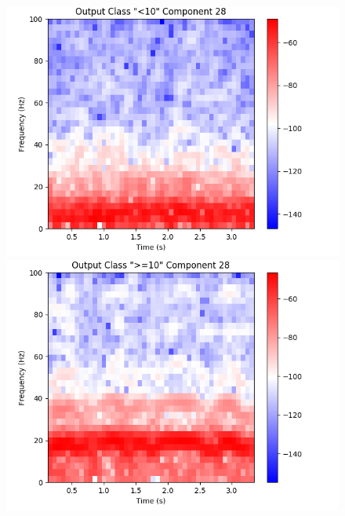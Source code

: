 \documentclass[fleqn,10pt]{wlscirep}
\begin{document}
\begin{figure}
\begin{minipage}{0.24\textwidth}
    \includegraphics[width=\linewidth]{max_act/artificial_spec_28_0.png}
    \subcaption{}
  \end{minipage}
  \hspace*{\fill} 
  \begin{minipage}{0.24\textwidth}
    \includegraphics[width=\linewidth]{max_act/artificial_spec_28_1.png}
    \subcaption{}
  \end{minipage}
  \begin{minipage}{0.24\textwidth}

\end{minipage}
\end{figure}
\end{document}
